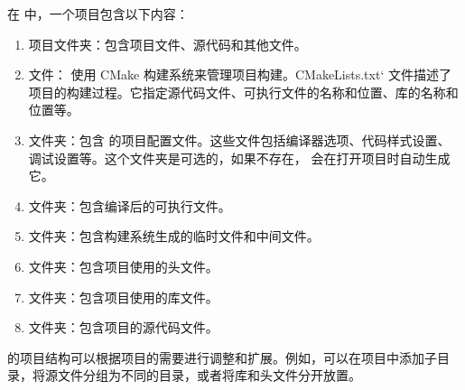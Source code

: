 \documentclass[a4paper,12pt,english]{sphinxmanual}
\begin{document}
\sphinxAtStartPar
在  中，一个项目包含以下内容：
\begin{enumerate}
%
\item {} 
\sphinxAtStartPar
项目文件夹：包含项目文件、源代码和其他文件。

\item {} 
\sphinxAtStartPar
{} 文件： 使用 CMake 构建系统来管理项目构建。CMakeLists.txt` 文件描述了项目的构建过程。它指定源代码文件、可执行文件的名称和位置、库的名称和位置等。

\item {} 
\sphinxAtStartPar
{} 文件夹：包含  的项目配置文件。这些文件包括编译器选项、代码样式设置、调试设置等。这个文件夹是可选的，如果不存在， 会在打开项目时自动生成它。

\item {} 
\sphinxAtStartPar
{} 文件夹：包含编译后的可执行文件。

\item {} 
\sphinxAtStartPar
{} 文件夹：包含构建系统生成的临时文件和中间文件。

\item {} 
\sphinxAtStartPar
{} 文件夹：包含项目使用的头文件。

\item {} 
\sphinxAtStartPar
{} 文件夹：包含项目使用的库文件。

\item {} 
\sphinxAtStartPar
{} 文件夹：包含项目的源代码文件。

\end{enumerate}

\sphinxAtStartPar
{} 的项目结构可以根据项目的需要进行调整和扩展。例如，可以在项目中添加子目录，将源文件分组为不同的目录，或者将库和头文件分开放置。
\end{document}
